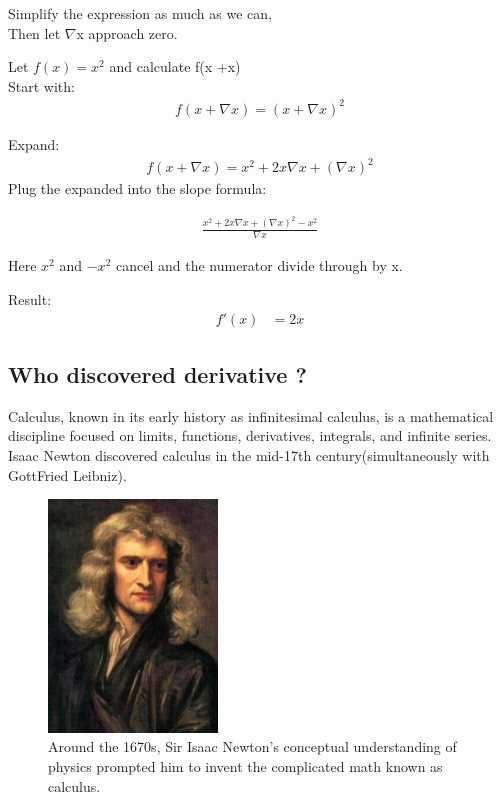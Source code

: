 \documentclass[aps,pra,notitlepage,amsmath,amssymb,letterpaper,12pt]{revtex4-1}
\newenvironment{problem}[2][Problem]{\begin{trivlist}
\item[\hskip \labelsep {\bfseries #1}\hskip \labelsep {\bfseries #2.}]}{\end{trivlist}}
\begin{document}
Simplify the expression as much as we can,\\
Then let $\nabla$x approach zero.\\
\begin{problem}{1}
Let $f(x) = x^2$ and calculate f(x +\nabla x)\\

Start with:\\
\begin{align}
f(x +\nabla x) = (x +\nabla x)^2
\end{align}

Expand:\\
\begin{align}
f(x +\nabla x) = x^2 + 2x\nabla x +(\nabla x)^2
\end{align}
Plug the expanded into the slope formula:

\begin{align}
\frac{x^2 + 2x\nabla x +(\nabla x)^2 - x^2}{\nabla x} 
\end{align}

Here $x^2$ and $-x^2$ cancel and the numerator divide through by \nabla x.

Result:
\begin{align}
f'(x) &= 2x
\end{align}

\subsection{Who discovered derivative ?} %

Calculus, known in its early history as infinitesimal calculus, is a mathematical discipline focused on limits, functions, derivatives, integrals, and infinite series. Isaac Newton discovered calculus in the mid-17th century(simultaneously with GottFried Leibniz).

\begin{figure}[h!] %
  \includegraphics[width=0.4\textwidth]
  {GodfreyKneller-IsaacNewton-1689.jpg}  %
  \caption{Around the 1670s, Sir Isaac Newton's conceptual understanding of physics prompted him to invent the complicated math known as calculus.}
  \label{fig:figlabel}
\end{figure}

\end{problem}
\end{document}
